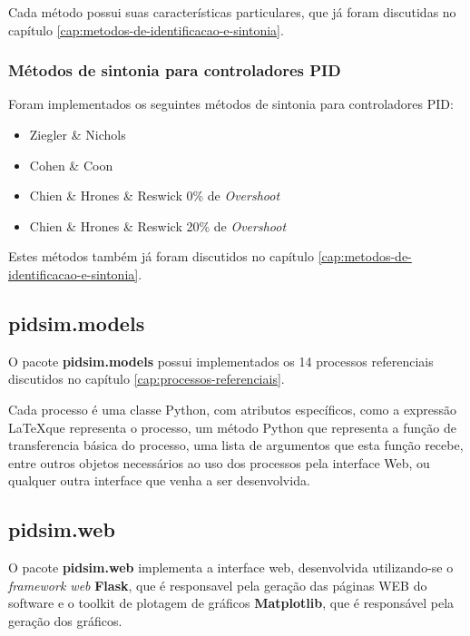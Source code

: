             Cada método possui suas características particulares, que já foram discutidas no capítulo
            \ref{cap:metodos-de-identificacao-e-sintonia}.

        \subsubsection{Métodos de sintonia para controladores \acs{PID}}
            
            Foram implementados os seguintes métodos de sintonia para controladores \acs{PID}:

            \begin{itemize}
                \item Ziegler \& Nichols
                \item Cohen \& Coon
                \item Chien \& Hrones \& Reswick 0\% de \textit{Overshoot}
                \item Chien \& Hrones \& Reswick 20\% de \textit{Overshoot}
            \end{itemize}

            Estes métodos também já foram discutidos no capítulo
            \ref{cap:metodos-de-identificacao-e-sintonia}.

        \subsection{pidsim.models}
            
            O pacote \textbf{pidsim.models} possui implementados os 14 processos referenciais
            discutidos no capítulo \ref{cap:processos-referenciais}.

            Cada processo é uma classe Python, com atributos específicos, como a expressão
            \LaTeX que representa o processo, um método Python que representa a função de
            transferencia básica do processo, uma lista de argumentos que esta função recebe,
            entre outros objetos necessários ao uso dos processos pela interface Web, ou qualquer
            outra interface que venha a ser desenvolvida.

        \subsection{pidsim.web}
            
            O pacote \textbf{pidsim.web} implementa a interface web, desenvolvida utilizando-se
            o \textit{framework web} \textbf{Flask}, que é responsavel pela geração das páginas
            WEB do software e o toolkit de plotagem de gráficos \textbf{Matplotlib}, que é
            responsável pela geração dos gráficos.

